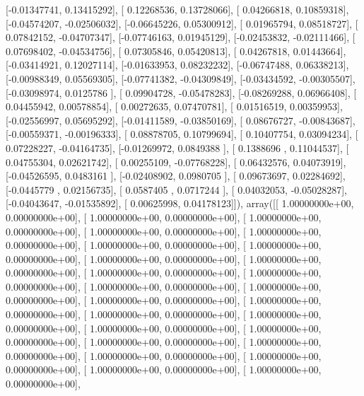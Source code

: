 \documentclass{article}
\begin{document}
       [-0.01347741,  0.13415292],
       [ 0.12268536,  0.13728066],
       [ 0.04266818,  0.10859318],
       [-0.04574207, -0.02506032],
       [-0.06645226,  0.05300912],
       [ 0.01965794,  0.08518727],
       [ 0.07842152, -0.04707347],
       [-0.07746163,  0.01945129],
       [-0.02453832, -0.02111466],
       [ 0.07698402, -0.04534756],
       [ 0.07305846,  0.05420813],
       [ 0.04267818,  0.01443664],
       [-0.03414921,  0.12027114],
       [-0.01633953,  0.08232232],
       [-0.06747488,  0.06338213],
       [-0.00988349,  0.05569305],
       [-0.07741382, -0.04309849],
       [-0.03434592, -0.00305507],
       [-0.03098974,  0.0125786 ],
       [ 0.09904728, -0.05478283],
       [-0.08269288,  0.06966408],
       [ 0.04455942,  0.00578854],
       [ 0.00272635,  0.07470781],
       [ 0.01516519,  0.00359953],
       [-0.02556997,  0.05695292],
       [-0.01411589, -0.03850169],
       [ 0.08676727, -0.00843687],
       [-0.00559371, -0.00196333],
       [ 0.08878705,  0.10799694],
       [ 0.10407754,  0.03094234],
       [ 0.07228227, -0.04164735],
       [-0.01269972,  0.0849388 ],
       [ 0.1388696 ,  0.11044537],
       [ 0.04755304,  0.02621742],
       [ 0.00255109, -0.07768228],
       [ 0.06432576,  0.04073919],
       [-0.04526595,  0.0483161 ],
       [-0.02408902,  0.0980705 ],
       [ 0.09673697,  0.02284692],
       [-0.0445779 ,  0.02156735],
       [ 0.0587405 ,  0.0717244 ],
       [ 0.04032053, -0.05028287],
       [-0.04043647, -0.01535892],
       [ 0.00625998,  0.04178123]]), array([[ 1.00000000e+00,  0.00000000e+00],
       [ 1.00000000e+00,  0.00000000e+00],
       [ 1.00000000e+00,  0.00000000e+00],
       [ 1.00000000e+00,  0.00000000e+00],
       [ 1.00000000e+00,  0.00000000e+00],
       [ 1.00000000e+00,  0.00000000e+00],
       [ 1.00000000e+00,  0.00000000e+00],
       [ 1.00000000e+00,  0.00000000e+00],
       [ 1.00000000e+00,  0.00000000e+00],
       [ 1.00000000e+00,  0.00000000e+00],
       [ 1.00000000e+00,  0.00000000e+00],
       [ 1.00000000e+00,  0.00000000e+00],
       [ 1.00000000e+00,  0.00000000e+00],
       [ 1.00000000e+00,  0.00000000e+00],
       [ 1.00000000e+00,  0.00000000e+00],
       [ 1.00000000e+00,  0.00000000e+00],
       [ 1.00000000e+00,  0.00000000e+00],
       [ 1.00000000e+00,  0.00000000e+00],
       [ 1.00000000e+00,  0.00000000e+00],
       [ 1.00000000e+00,  0.00000000e+00],
       [ 1.00000000e+00,  0.00000000e+00],
       [ 1.00000000e+00,  0.00000000e+00],
       [ 1.00000000e+00,  0.00000000e+00],
       [ 1.00000000e+00,  0.00000000e+00],
       [ 1.00000000e+00,  0.00000000e+00],
\end{document}

